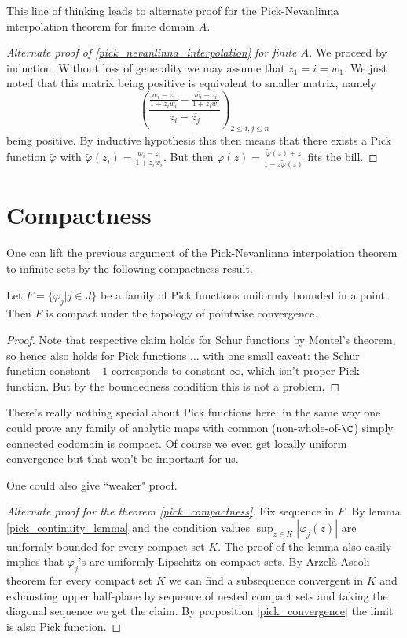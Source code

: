 This line of thinking leads to alternate proof for the Pick-Nevanlinna interpolation theorem for finite domain $A$.

\begin{proof}[Alternate proof of \ref{pick_nevanlinna_interpolation} for finite $A$]
	We proceed by induction. Without loss of generality we may assume that $z_{1} = i = w_{1}$. We just noted that this matrix being positive is equivalent to smaller matrix, namely
	\[
		\left(\frac{\frac{w_{i} - z_{i}}{1 + z_{i} w_{i}} - \frac{\overline{w_{i}} - \overline{z_{i}}}{1 + \overline{z_{i}} \overline{w_{i}}}}{z_{i} - \overline{z_{j}}}\right)_{2 \leq i, j \leq n}
	\]
	being positive. By inductive hypothesis this then means that there exists a Pick function $\tilde{\varphi}$ with $\tilde{\varphi}(z_{i}) = \frac{w_{i} - z_{i}}{1 + z_{i} w_{i}}$. But then $\varphi(z) = \frac{\tilde{\varphi}(z) + z}{1 - z \tilde{\varphi}(z)}$ fits the bill.
\end{proof}

\section{Compactness}

One can lift the previous argument of the Pick-Nevanlinna interpolation theorem to infinite sets by the following compactness result.

\begin{lause}\label{pick_compactness}
	Let $F = \{\varphi_{j} | j \in J \}$ be a family of Pick functions uniformly bounded in a point. Then $F$ is compact under the topology of pointwise convergence.
\end{lause}
\begin{proof}
	Note that respective claim holds for Schur functions by Montel's theorem, so hence also holds for Pick functions $\ldots$ with one small caveat: the Schur function constant $-1$ corresponds to constant $\infty$, which isn't proper Pick function. But by the boundedness condition this is not a problem.
\end{proof}

There's really nothing special about Pick functions here: in the same way one could prove any family of analytic maps with common (non-whole-of-$\C$) simply connected codomain is compact. Of course we even get locally uniform convergence but that won't be important for us.

One could also give ``weaker" proof.

\begin{proof}[Alternate proof for the theorem \ref{pick_compactness}]
	Fix sequence in $F$. By lemma \ref{pick_continuity_lemma} and the condition values $\sup_{z \in K}|\varphi_{j}(z)|$ are uniformly bounded for every compact set $K$. The proof of the lemma also easily implies that $\varphi_{j}$'s are uniformly Lipschitz on compact sets. By Arzel\`{a}-Ascoli theorem for every compact set $K$ we can find a subsequence convergent in $K$ and exhausting upper half-plane by sequence of nested compact sets and taking the diagonal sequence we get the claim. By proposition \ref{pick_convergence} the limit is also Pick function.
\end{proof}

